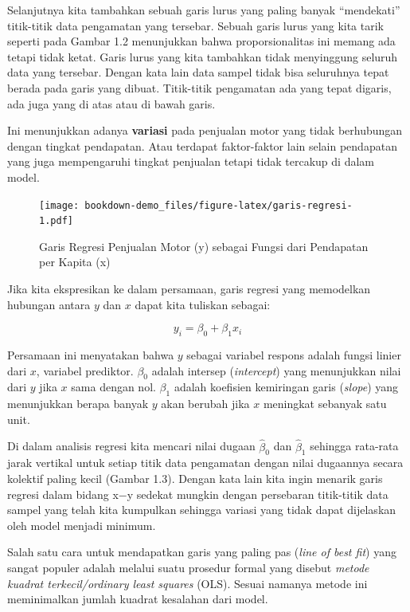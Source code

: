 \documentclass[
]{book}
\begin{document}
Selanjutnya kita tambahkan sebuah garis lurus yang paling banyak ``mendekati'' titik-titik data pengamatan yang tersebar. Sebuah garis lurus yang kita tarik seperti pada Gambar 1.2 menunjukkan bahwa proporsionalitas ini memang ada tetapi tidak ketat. Garis lurus yang kita tambahkan tidak menyinggung seluruh data yang tersebar. Dengan kata lain data sampel tidak bisa seluruhnya tepat berada pada garis yang dibuat. Titik-titik pengamatan ada yang tepat digaris, ada juga yang di atas atau di bawah garis.

Ini menunjukkan adanya \textbf{variasi} pada penjualan motor yang tidak berhubungan dengan tingkat pendapatan. Atau terdapat faktor-faktor lain selain pendapatan yang juga mempengaruhi tingkat penjualan tetapi tidak tercakup di dalam model.

\begin{figure}
\centering
\texttt{[image: bookdown-demo\_files/figure-latex/garis-regresi-1.pdf]}
\caption{\label{fig:garis-regresi}Garis Regresi Penjualan Motor (y) sebagai Fungsi dari Pendapatan per Kapita (x)}
\end{figure}

Jika kita ekspresikan ke dalam persamaan, garis regresi yang memodelkan hubungan antara \(y\) dan \(x\) dapat kita tuliskan sebagai:

\begin{equation} 
y_i=\beta_0 + \beta_1x_i
\label{eq:persamaan-noerror}
\end{equation}

Persamaan ini menyatakan bahwa \(y\) sebagai variabel respons adalah fungsi linier dari \(x\), variabel prediktor. \(\beta_0\) adalah intersep (\emph{intercept}) yang menunjukkan nilai dari \(y\) jika \(x\) sama dengan nol. \(\beta_1\) adalah koefisien kemiringan garis (\emph{slope}) yang menunjukkan berapa banyak \(y\) akan berubah jika \(x\) meningkat sebanyak satu unit.

Di dalam analisis regresi kita mencari nilai dugaan \(\hat \beta_0\) dan \(\hat \beta_1\) sehingga rata-rata jarak vertikal untuk setiap titik data pengamatan dengan nilai dugaannya secara kolektif paling
kecil (Gambar 1.3). Dengan kata lain kita ingin menarik garis regresi dalam bidang x−y sedekat mungkin dengan persebaran titik-titik data sampel yang telah
kita kumpulkan sehingga variasi yang tidak dapat dijelaskan oleh model menjadi minimum.

Salah satu cara untuk mendapatkan garis yang paling pas (\emph{line of best fit}) yang sangat populer adalah melalui suatu prosedur formal yang disebut \emph{metode kuadrat terkecil/ordinary least squares} (OLS). Sesuai namanya metode ini meminimalkan jumlah kuadrat kesalahan dari model.
\end{document}
